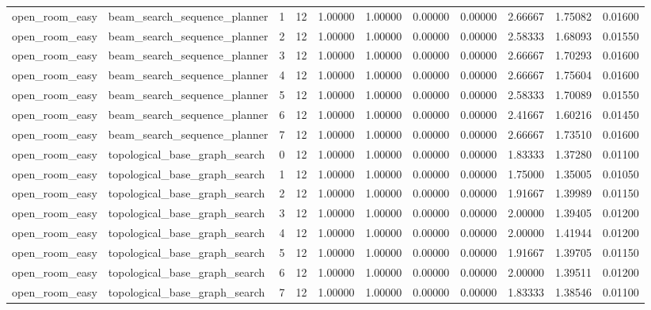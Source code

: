 \documentclass{article}
\begin{document}
\begin{table}[tbp]
{\begin{tabular}{lllllllllll}
open\_room\_easy & beam\_search\_sequence\_planner & 1 & 12 & 1.00000 & 1.00000 & 0.00000 & 0.00000 & 2.66667 & 1.75082 & 0.01600 \\
open\_room\_easy & beam\_search\_sequence\_planner & 2 & 12 & 1.00000 & 1.00000 & 0.00000 & 0.00000 & 2.58333 & 1.68093 & 0.01550 \\
open\_room\_easy & beam\_search\_sequence\_planner & 3 & 12 & 1.00000 & 1.00000 & 0.00000 & 0.00000 & 2.66667 & 1.70293 & 0.01600 \\
open\_room\_easy & beam\_search\_sequence\_planner & 4 & 12 & 1.00000 & 1.00000 & 0.00000 & 0.00000 & 2.66667 & 1.75604 & 0.01600 \\
open\_room\_easy & beam\_search\_sequence\_planner & 5 & 12 & 1.00000 & 1.00000 & 0.00000 & 0.00000 & 2.58333 & 1.70089 & 0.01550 \\
open\_room\_easy & beam\_search\_sequence\_planner & 6 & 12 & 1.00000 & 1.00000 & 0.00000 & 0.00000 & 2.41667 & 1.60216 & 0.01450 \\
open\_room\_easy & beam\_search\_sequence\_planner & 7 & 12 & 1.00000 & 1.00000 & 0.00000 & 0.00000 & 2.66667 & 1.73510 & 0.01600 \\
open\_room\_easy & topological\_base\_graph\_search & 0 & 12 & 1.00000 & 1.00000 & 0.00000 & 0.00000 & 1.83333 & 1.37280 & 0.01100 \\
open\_room\_easy & topological\_base\_graph\_search & 1 & 12 & 1.00000 & 1.00000 & 0.00000 & 0.00000 & 1.75000 & 1.35005 & 0.01050 \\
open\_room\_easy & topological\_base\_graph\_search & 2 & 12 & 1.00000 & 1.00000 & 0.00000 & 0.00000 & 1.91667 & 1.39989 & 0.01150 \\
open\_room\_easy & topological\_base\_graph\_search & 3 & 12 & 1.00000 & 1.00000 & 0.00000 & 0.00000 & 2.00000 & 1.39405 & 0.01200 \\
open\_room\_easy & topological\_base\_graph\_search & 4 & 12 & 1.00000 & 1.00000 & 0.00000 & 0.00000 & 2.00000 & 1.41944 & 0.01200 \\
open\_room\_easy & topological\_base\_graph\_search & 5 & 12 & 1.00000 & 1.00000 & 0.00000 & 0.00000 & 1.91667 & 1.39705 & 0.01150 \\
open\_room\_easy & topological\_base\_graph\_search & 6 & 12 & 1.00000 & 1.00000 & 0.00000 & 0.00000 & 2.00000 & 1.39511 & 0.01200 \\
open\_room\_easy & topological\_base\_graph\_search & 7 & 12 & 1.00000 & 1.00000 & 0.00000 & 0.00000 & 1.83333 & 1.38546 & 0.01100 \\

\end{tabular}}
\end{table}
\end{document}
